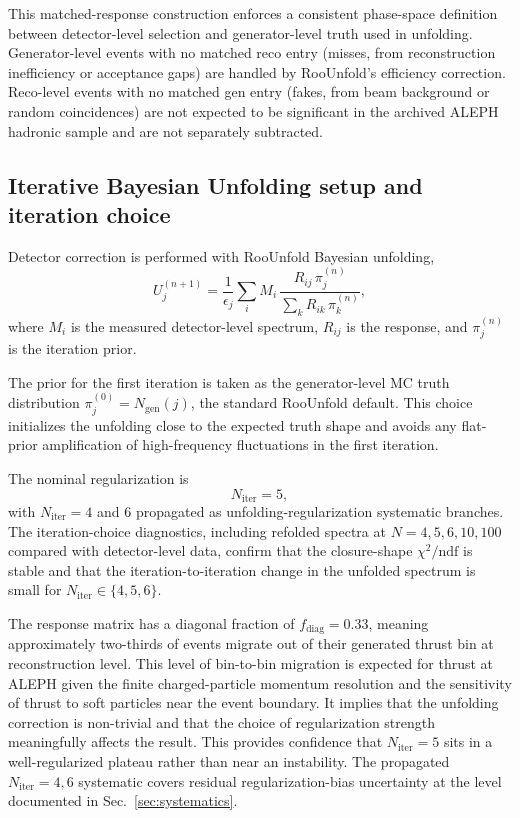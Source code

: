 This matched-response construction enforces a consistent phase-space definition between detector-level selection and generator-level truth used in unfolding. Generator-level events with no matched reco entry (misses, from reconstruction inefficiency or acceptance gaps) are handled by RooUnfold's efficiency correction. Reco-level events with no matched gen entry (fakes, from beam background or random coincidences) are not expected to be significant in the archived ALEPH hadronic sample and are not separately subtracted.

\subsection{Iterative Bayesian Unfolding setup and iteration choice}

Detector correction is performed with RooUnfold Bayesian unfolding,
\begin{equation}
U_j^{(n+1)} = \frac{1}{\epsilon_j}\sum_i M_i\,\frac{R_{ij}\,\pi_j^{(n)}}{\sum_k R_{ik}\,\pi_k^{(n)}},
\end{equation}
where $M_i$ is the measured detector-level spectrum, $R_{ij}$ is the response, and $\pi_j^{(n)}$ is the iteration prior.

The prior for the first iteration is taken as the generator-level MC truth distribution $\pi_j^{(0)} = N_{\mathrm{gen}}(j)$, the standard RooUnfold default. This choice initializes the unfolding close to the expected truth shape and avoids any flat-prior amplification of high-frequency fluctuations in the first iteration.

The nominal regularization is
\begin{equation}
N_{\mathrm{iter}}=5,
\end{equation}
with $N_{\mathrm{iter}}=4$ and $6$ propagated as unfolding-regularization systematic branches.
The iteration-choice diagnostics, including refolded spectra at $N=4,5,6,10,100$ compared with detector-level data, confirm that the closure-shape $\chi^2/\mathrm{ndf}$ is stable and that the iteration-to-iteration change in the unfolded spectrum is small for $N_{\mathrm{iter}}\in\{4,5,6\}$.

The response matrix has a diagonal fraction of $f_{\mathrm{diag}}=0.33$, meaning approximately two-thirds of events migrate out of their generated thrust bin at reconstruction level. This level of bin-to-bin migration is expected for thrust at ALEPH given the finite charged-particle momentum resolution and the sensitivity of thrust to soft particles near the event boundary. It implies that the unfolding correction is non-trivial and that the choice of regularization strength meaningfully affects the result. This provides confidence that $N_{\mathrm{iter}}=5$ sits in a well-regularized plateau rather than near an instability. The propagated $N_{\mathrm{iter}}=4,6$ systematic covers residual regularization-bias uncertainty at the level documented in Sec.~\ref{sec:systematics}.

